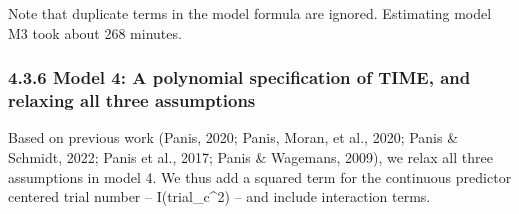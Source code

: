 \documentclass[
  man,floatsintext]{apa6}
\begin{document}
\normalsize

Note that duplicate terms in the model formula are ignored. Estimating model M3 took about 268 minutes.

\subsubsection{4.3.6 Model 4: A polynomial specification of TIME, and relaxing all three assumptions}\label{model-4-a-polynomial-specification-of-time-and-relaxing-all-three-assumptions}

Based on previous work (Panis, 2020; Panis, Moran, et al., 2020; Panis \& Schmidt, 2022; Panis et al., 2017; Panis \& Wagemans, 2009), we relax all three assumptions in model 4. We thus add a squared term for the continuous predictor centered trial number -- I(trial\_c\^{}2) -- and include interaction terms.

\scriptsize
\end{document}
